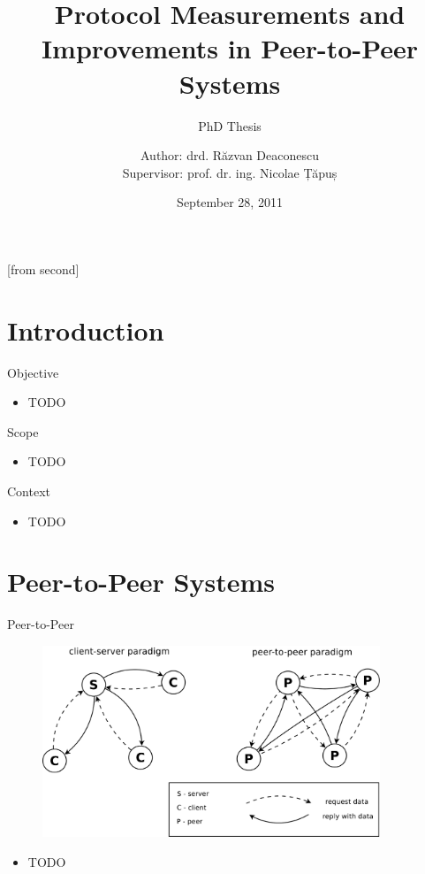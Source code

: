 \documentclass{beamer}
\title[Protocol Measurements and Improvements in Peer-to-Peer
Systems]{Protocol Measurements and Improvements in Peer-to-Peer Systems}
\subtitle{PhD Thesis}
\institute[CSE, ACS, UPB]{University POLITEHNICA of Bucharest}
\author[Răzvan Deaconescu]{Author: drd. Răzvan Deaconescu\\
Supervisor: prof. dr. ing. Nicolae Țăpuș}
\date{September 28, 2011}
\begin{document}
[from second]


\frame{\titlepage}

\section{Introduction}

\begin{frame}{Objective}
  \begin{itemize}
    \item TODO
  \end{itemize}
\end{frame}

\begin{frame}{Scope}
  \begin{itemize}
    \item TODO
  \end{itemize}
\end{frame}

\begin{frame}{Context}
  \begin{itemize}
    \item TODO
  \end{itemize}
\end{frame}

\section{Peer-to-Peer Systems}

\begin{frame}{Peer-to-Peer}
  \begin{figure}
    \includegraphics[width=0.9\textwidth]{img/client-server-vs-p2p}
  \end{figure}
  \begin{itemize}
    \item TODO
  \end{itemize}
\end{frame}
\end{document}
